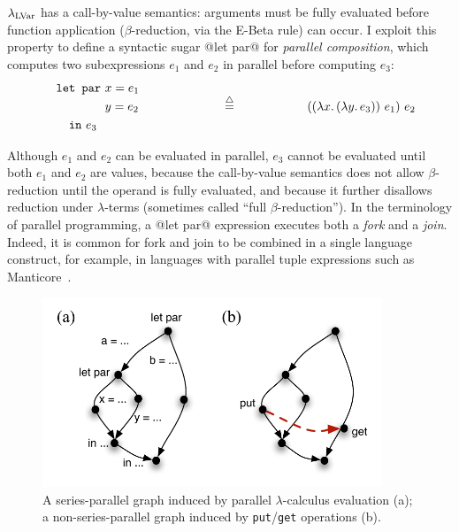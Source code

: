 $\lambda_{\textrm{LVar}}$ has a call-by-value semantics: arguments must be fully
evaluated before function application ($\beta$-reduction, via the {\sc
  E-Beta} rule) can occur.  I exploit this property to define a
syntactic sugar @let par@ for \emph{parallel composition}, which
computes two subexpressions $e_1$ and $e_2$ in parallel before
computing $e_3$:
\begin{displaymath}
\begin{minipage}[b]{2in}
  \begin{equation*}
\begin{split}
& \LETPAR ~x = e_1 \\ 
& \letparspace ~y = e_2 \\
& \letspace \IN~e_3 
\end{split}
\end{equation*}
\end{minipage}
\begin{minipage}[b]{1in}
\centering
$\defeq$
\end{minipage}
\begin{minipage}[b]{2in}
\begin{equation*}
  \app{(\app{(\lam{x}{(\lam{y}{e_3})})}{e_1})}{e_2}
\end{equation*}
\end{minipage}
\end{displaymath}

Although $e_1$ and $e_2$ can be evaluated in parallel, $e_3$ cannot be
evaluated until both $e_1$ and $e_2$ are values, because the
call-by-value semantics does not allow $\beta$-reduction until the
operand is fully evaluated, and because it further disallows reduction
under $\lambda$-terms (sometimes called ``full $\beta$-reduction'').
In the terminology of parallel programming, a @let par@ expression
executes both a \emph{fork} and a \emph{join}.  Indeed, it is common
for fork and join to be combined in a single language construct, for
example, in languages with parallel tuple expressions such as
Manticore~\cite{manticore_parallel_tuples}.

\begin{figure}[tb]
  \centering 
\includegraphics[width=4in]{chapter2/figures/lvars-series-parallel.pdf} 
\caption{A series-parallel graph induced by parallel
  $\lambda$-calculus evaluation (a); a non-series-parallel graph
  induced by \lstinline|put|/\lstinline|get| operations (b).}
  \label{f:lvars-series-parallel}
\end{figure}

